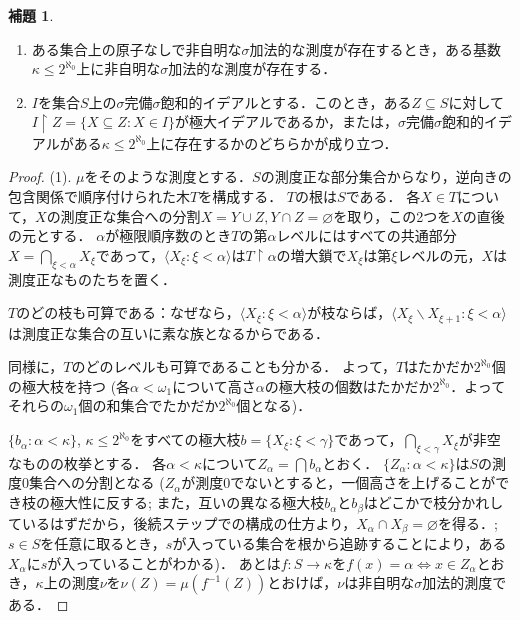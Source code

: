 \documentclass[uplatex]{jsarticle}
\newcommand{\restrict}{\upharpoonright}
\newcommand{\seq}[1]{{\langle#1\rangle}}
\renewcommand\emptyset{\varnothing}
\renewcommand\subset{\subseteq}
\renewcommand{\setminus}{\smallsetminus}
\theoremstyle{definition}
\newtheorem{lem}[thm]{補題}
\begin{document}
	\begin{lem}\label{lem:continuum}
		\begin{enumerate}
			\item ある集合上の原子なしで非自明な$\sigma$加法的な測度が存在するとき，ある基数$\kappa \le 2^{\aleph_0}$上に非自明な$\sigma$加法的な測度が存在する．
			\item $I$を集合$S$上の$\sigma$完備$\sigma$飽和的イデアルとする．このとき，ある$Z \subset S$に対して$I \restrict Z = \{ X \subset Z : X \in I \}$が極大イデアルであるか，または，$\sigma$完備$\sigma$飽和的イデアルがある$\kappa \le 2^{\aleph_0}$上に存在するかのどちらかが成り立つ．
		\end{enumerate}
	\end{lem}
	\begin{proof}
		(1). $\mu$をそのような測度とする．$S$の測度正な部分集合からなり，逆向きの包含関係で順序付けられた木$T$を構成する．
		$T$の根は$S$である．
		各$X \in T$について，$X$の測度正な集合への分割$X = Y \cup Z, Y \cap Z = \emptyset$を取り，この2つを$X$の直後の元とする．
		$\alpha$が極限順序数のとき$T$の第$\alpha$レベルにはすべての共通部分$X = \bigcap_{\xi < \alpha} X_\xi$であって，$\seq{X_\xi : \xi < \alpha}$は$T \restrict \alpha$の増大鎖で$X_\xi$は第$\xi$レベルの元，$X$は測度正なものたちを置く．
		
		$T$のどの枝も可算である：なぜなら，$\seq{X_\xi : \xi < \alpha}$が枝ならば，$\seq{ X_\xi \setminus X_{\xi+1} : \xi < \alpha }$は測度正な集合の互いに素な族となるからである．
		
		同様に，$T$のどのレベルも可算であることも分かる．
		よって，$T$はたかだか$2^{\aleph_0}$個の極大枝を持つ (各$\alpha < \omega_1$について高さ$\alpha$の極大枝の個数はたかだか$2^{\aleph_0}$．よってそれらの$\omega_1$個の和集合でたかだか$2^{\aleph_0}$個となる)．
		
		$\{ b_\alpha : \alpha < \kappa \}$, $\kappa \le 2^{\aleph_0}$をすべての極大枝$b = \{ X_\xi : \xi < \gamma \}$であって，$\bigcap_{\xi < \gamma} X_\xi$が非空なものの枚挙とする．
		各$\alpha < \kappa$について$Z_\alpha = \bigcap b_\alpha$とおく．
		$\{ Z_\alpha : \alpha < \kappa \}$は$S$の測度$0$集合への分割となる 
		($Z_\alpha$が測度$0$でないとすると，一個高さを上げることができ枝の極大性に反する; また，互いの異なる極大枝$b_\alpha$と$b_\beta$はどこかで枝分かれしているはずだから，後続ステップでの構成の仕方より，$X_\alpha \cap X_\beta = \emptyset$を得る．; $s \in S$を任意に取るとき，$s$が入っている集合を根から追跡することにより，ある$X_\alpha$に$s$が入っていることがわかる)．
		あとは$f \colon S \to \kappa$を$f(x) = \alpha \iff x \in Z_\alpha$とおき，$\kappa$上の測度$\nu$を$\nu(Z) = \mu(f^{-1}(Z))$とおけば，$\nu$は非自明な$\sigma$加法的測度である．
		

\end{proof}
\end{document}
